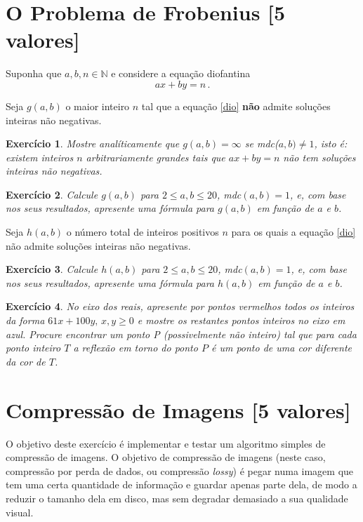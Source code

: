 \documentclass{article}
\newtheorem{ex}{Exercício}[section]
\begin{document}
\section{O Problema de Frobenius [5 valores]}

Suponha que $a,b,n\in\mathbb{N}$ e considere a equação diofantina
\begin{equation}
ax+by=n \, .
\label{dio}
\end{equation}

Seja $g(a,b)$ o maior inteiro $n$ tal que a equação \eqref{dio} {\bf não} admite soluções inteiras não negativas.


\begin{ex}
Mostre analíticamente que $g(a,b)=\infty$ se  mdc($a,b)\neq 1$, isto é: existem inteiros $n$ arbitrariamente grandes tais que $ax + by = n$ não tem soluções inteiras não negativas.
\end{ex}

\begin{ex}
Calcule $g(a,b)$ para $2\leq a,b\leq 20$, mdc$(a,b)=1$, e, com base nos seus resultados, apresente uma fórmula para  $g(a,b)$ em função de $a$ e $b$.
\end{ex}


Seja $h(a,b)$ o número total de  inteiros positivos $n$ para os quais a equação \eqref{dio}  não admite soluções inteiras não negativas.

\begin{ex}
Calcule $h(a,b)$ para $2\leq a,b\leq 20$, mdc$(a,b)=1$, e, com base nos seus resultados, apresente uma fórmula para $h(a,b)$ em função de $a$ e $b$.
\end{ex}

\begin{ex}
No eixo dos reais, apresente por pontos vermelhos todos os inteiros da forma $61x+100y, \, x,y\geq0$ e mostre os restantes pontos inteiros no eixo em azul.
Procure encontrar um ponto P (possivelmente não inteiro) tal que para cada ponto inteiro $T$ a reflexão em torno do ponto $P$ \'e um ponto de uma cor diferente da cor de $T$.
\end{ex}


\section{Compressão de Imagens [5 valores]}

O objetivo deste exercício é implementar e testar um algoritmo simples de compressão de imagens. O objetivo de compressão de imagens (neste caso, compressão por perda de dados, ou compressão \textit{lossy}) é pegar numa imagem que tem uma certa quantidade de informação e guardar apenas parte dela, de modo a reduzir o tamanho dela em disco, mas sem degradar demasiado a sua qualidade visual.
\end{document}
